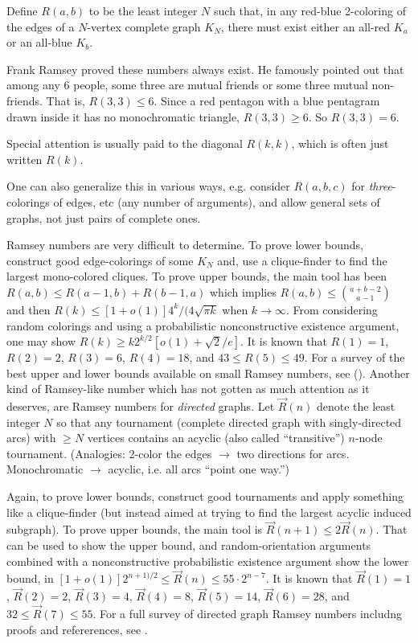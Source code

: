 \documentclass[12pt]{article}
\begin{document}

Define $R(a,b)$ to be the least integer $N$ such that, in any red-blue 2-coloring of the edges of a $N$-vertex complete graph $K_N$,
there must exist either an all-red $K_a$ or an all-blue $K_b$.

Frank Ramsey proved these numbers always exist.
He famously pointed out that among any 6 people, some three are mutual friends
or some three mutual non-friends.  That is, $R(3,3)\le 6$.
Since a red pentagon with a blue pentagram drawn inside it has no monochromatic triangle,
$R(3,3)\ge 6$.  So $R(3,3)=6$.

Special attention is usually paid to the diagonal $R(k,k)$, which is often just written $R(k)$.

One can also generalize this in various ways,
e.g. consider $R(a,b,c)$ for {\it three}-colorings of edges, etc (any number of
arguments), and allow general sets of graphs, not just pairs of complete ones.
 
Ramsey numbers are very difficult to determine.
To prove lower bounds, construct good edge-colorings of some $K_N$ and, use a clique-finder
to find the largest mono-colored cliques.
To prove upper bounds, the main tool has been $R(a,b)\le R(a-1,b)+R(b-1,a)$
which implies $R(a,b) \le {{a+b-2} \choose {a-1}}$ and then $R(k) \le [1+o(1)] 4^k / (4 \sqrt{\pi k}$
when $k \to \infty$.
From considering random colorings and using a probabilistic nonconstructive existence
argument, one may show $R(k) \ge k 2^{k/2} [ o(1) + \sqrt{2} / e ]$.
It is known that $R(1)=1$, $R(2)=2$, $R(3)=6$, $R(4)=18$, and $43 \le R(5) \le 49$.
For a survey of the best upper and lower bounds available on small
Ramsey numbers, see 
().
Another kind of Ramsey-like number which has not gotten as much attention as it deserves,
are Ramsey numbers for {\it directed} graphs.
Let $\vec{R}(n)$ denote the least integer $N$ so that any tournament (complete directed graph
with singly-directed arcs) with $\ge N$ vertices contains an acyclic (also called ``transitive'')
$n$-node tournament.  (Analogies: 2-color the edges $\to$ two directions for arcs.
Monochromatic $\to$ acyclic, i.e. all arcs ``point one way.'')

Again, to prove lower bounds, construct good tournaments and apply something like
a clique-finder (but instead aimed at trying to find the largest acyclic induced subgraph).
To prove upper bounds, the main tool is $\vec{R}(n+1) \le 2 \vec{R}(n)$.
That can be used to show the upper bound, and
random-orientation arguments combined with a nonconstructive probabilistic existence argument
show the lower bound, in $[1+o(1)] 2^{n+1)/2} \le \vec{R}(n) \le 55 \cdot 2^{n-7}$.
It is known that $\vec{R}(1)=1$, 
$\vec{R}(2)=2$,
$\vec{R}(3)=4$,
$\vec{R}(4)=8$,
$\vec{R}(5)=14$,
$\vec{R}(6)=28$,
and
$32 \le \vec{R}(7) \le 55$.
For a full survey of directed graph Ramsey numbers includng proofs and refererences,
see .

\end{document}
